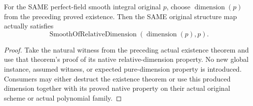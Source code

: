 \begin{definition}
\label{def:c0n-produced-smooth-dimension}
\leanok
{}
For the SAME perfect-field smooth integral original $p$, choose
$\operatorname{dimension}(p)$ from the preceding proved existence.
Then the SAME original structure map actually satisfies
\[
 \operatorname{SmoothOfRelativeDimension}(\operatorname{dimension}(p),p).
\]
\end{definition}
\begin{proof}
Take the natural witness from the preceding actual existence theorem and
use that theorem's proof of its native relative-dimension property. No
new global instance, assumed witness, or expected pure-dimension property
is introduced. Consumers may either destruct the existence theorem or use
this produced dimension together with its proved native property on their
actual original scheme or actual polynomial family.
\end{proof}
